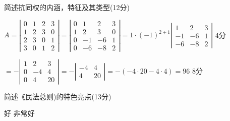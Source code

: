 \documentclass{jnuexam}
\begin{document}
\vfill

\newpagea %


\newpageb %

\begin{problem}
简述抗同权的内涵，特征及其类型(12分)
\end{problem}

\bigskip

\begin{solution}
$A = \left|\begin{array}{cccc}
    0 & 1 & 2 & 3\\
    1 & 2 & 3 & 0\\
    2 & 3 & 0 & 1\\
    3 & 0 & 1 & 2
  \end{array}\right| = \left|\begin{array}{cccc}
    0 & 1 & 2 & 3\\
    1 & 2 & 3 & 0\\
    0 & - 1 & - 6 & 1\\
    0 & - 6 & - 8 & 2
  \end{array}\right| = 1 \cdot (- 1)^{2 + 1} \left|\begin{array}{ccc}
    1 & 2 & 3\\
    - 1 & - 6 & 1\\
    - 6 & - 8 & 2
  \end{array}\right|$ \dotfill 4分\par
\qquad\qquad $= -\left|\begin{array}{ccc}
    1 & 2 & 3\\
    0 & - 4 & 4\\
    0 & 4 & 20
  \end{array}\right| = - \left|\begin{array}{cc}
    - 4 & 4\\
    4 & 20
  \end{array}\right| = -(-4\cdot20-4\cdot4) = 96$ \dotfill 8分
\end{solution}

\vfill

\begin{problem}
简述《民法总则)的特色亮点(13分)
\end{problem}

\bigskip

\begin{solution}
好
非常好
\end{solution}
\end{document}
